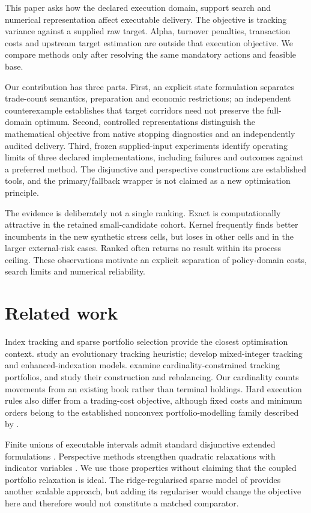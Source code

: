 \documentclass[preprint,12pt,authoryear]{elsarticle}
\begin{document}
This paper asks how the declared execution domain, support search and numerical
representation affect executable delivery. The objective is tracking variance
against a supplied raw target. Alpha, turnover penalties, transaction costs and
upstream target estimation are outside that execution objective. We compare
methods only after resolving the same mandatory actions and feasible base.

Our contribution has three parts. First, an explicit state formulation separates
trade-count semantics, preparation and economic restrictions; an independent
counterexample establishes that target corridors need not preserve the full-domain
optimum. Second, controlled representations distinguish the mathematical objective
from native stopping diagnostics and an independently audited delivery. Third,
frozen supplied-input experiments identify operating limits of three declared
implementations, including failures and outcomes against a preferred method.
The disjunctive and perspective constructions are established tools, and the
primary/fallback wrapper is not claimed as a new optimisation principle.

The evidence is deliberately not a single ranking. Exact is computationally
attractive in the retained small-candidate cohort. Kernel frequently finds
better incumbents in the new synthetic stress cells, but loses in other cells
and in the larger external-risk cases. Ranked often returns no result within
its process ceiling. These observations motivate an explicit separation of
policy-domain costs, search limits and numerical reliability.

\section{Related work}
Index tracking and sparse portfolio selection provide the closest optimisation
context. \citet{beasley2003} study an evolutionary tracking heuristic;
\citet{canakgoz2009} develop mixed-integer tracking and enhanced-indexation
models. \citet{mutunge2018} examine cardinality-constrained tracking portfolios,
and \citet{strub2018} study their construction and rebalancing. Our cardinality
counts movements from an existing book rather than terminal holdings. Hard
execution rules also differ from a trading-cost objective, although fixed costs
and minimum orders belong to the established nonconvex portfolio-modelling
family described by \citet{lobo2007}.

Finite unions of executable intervals admit standard disjunctive extended
formulations \citep{vielma2015}. Perspective methods strengthen quadratic
relaxations with indicator variables \citep{frangioni2006,gunluk2010}.
We use those properties without claiming that the coupled portfolio relaxation
is ideal. The ridge-regularised sparse model of \citet{bertsimas2022} provides
another scalable approach, but adding its regulariser would change the objective
here and therefore would not constitute a matched comparator.
\end{document}
